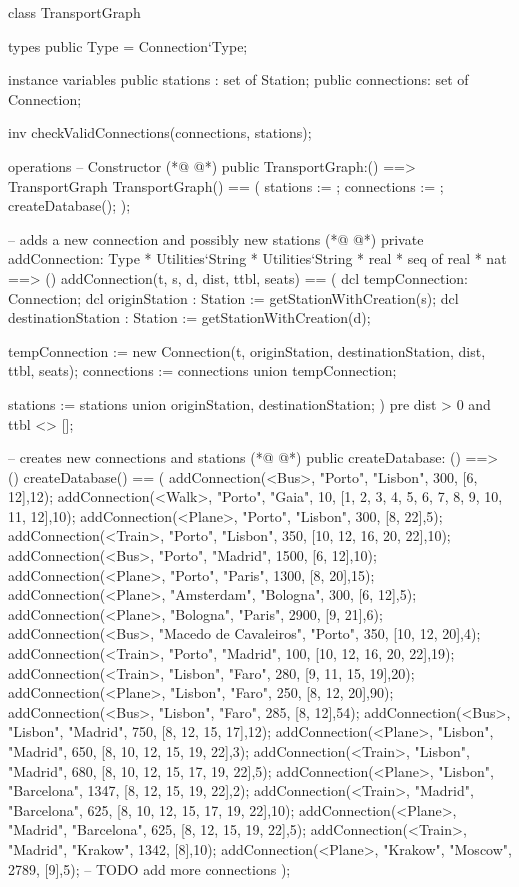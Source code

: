 \begin{vdmpp}[breaklines=true]
class TransportGraph

types
 public Type = Connection`Type;
 
instance variables
 public stations : set of Station;
 public connections: set of Connection;
 
 inv checkValidConnections(connections, stations);

operations
 -- Constructor
(*@
\label{TransportGraph:14}
@*)
 public TransportGraph:() ==> TransportGraph
 TransportGraph() ==
 (
  stations := {};
  connections := {};
  createDatabase();
 );
 
 -- adds a new connection and possibly new stations
(*@
\label{addConnection:23}
@*)
 private addConnection: Type * Utilities`String * Utilities`String * real * seq of real * nat ==> ()
 addConnection(t, s, d, dist, ttbl, seats) ==
 (
  dcl tempConnection: Connection;
  dcl originStation : Station := getStationWithCreation(s);
  dcl destinationStation : Station := getStationWithCreation(d);
  
  tempConnection := new Connection(t, originStation, destinationStation, dist, ttbl, seats);
  connections := connections union {tempConnection};
  
  stations := stations union {originStation, destinationStation};
 )
 pre dist > 0 and ttbl <> [];
  
 -- creates new connections and stations
(*@
\label{createDatabase:38}
@*)
 public createDatabase: () ==> ()
  createDatabase() ==
  (
   addConnection(<Bus>,   "Porto", "Lisbon", 300, [6, 12],12);
   addConnection(<Walk>,   "Porto", "Gaia", 10, [1, 2, 3, 4, 5, 6, 7, 8, 9, 10, 11, 12],10);
   addConnection(<Plane>, "Porto", "Lisbon", 300, [8, 22],5);
   addConnection(<Train>, "Porto", "Lisbon", 350, [10, 12, 16, 20, 22],10);
   addConnection(<Bus>,   "Porto", "Madrid", 1500, [6, 12],10);
   addConnection(<Plane>,   "Porto", "Paris", 1300, [8, 20],15);
   addConnection(<Plane>, "Amsterdam", "Bologna", 300, [6, 12],5);
   addConnection(<Plane>, "Bologna", "Paris", 2900, [9, 21],6);
   addConnection(<Bus>,   "Macedo de Cavaleiros", "Porto", 350, [10, 12, 20],4);
   addConnection(<Train>, "Porto", "Madrid", 100, [10, 12, 16, 20, 22],19);
   addConnection(<Train>, "Lisbon", "Faro", 280, [9, 11, 15, 19],20);
   addConnection(<Plane>, "Lisbon", "Faro", 250, [8, 12, 20],90);
   addConnection(<Bus>,   "Lisbon", "Faro", 285, [8, 12],54);
   addConnection(<Bus>, "Lisbon", "Madrid", 750, [8, 12, 15, 17],12);
   addConnection(<Plane>, "Lisbon", "Madrid", 650, [8, 10, 12, 15, 19, 22],3);
   addConnection(<Train>, "Lisbon", "Madrid", 680, [8, 10, 12, 15, 17, 19, 22],5);
   addConnection(<Plane>, "Lisbon", "Barcelona", 1347, [8, 12, 15, 19, 22],2);
   addConnection(<Train>, "Madrid", "Barcelona", 625, [8, 10, 12, 15, 17, 19, 22],10);
   addConnection(<Plane>, "Madrid", "Barcelona", 625, [8, 12, 15, 19, 22],5);
   addConnection(<Train>, "Madrid", "Krakow", 1342, [8],10);
   addConnection(<Plane>, "Krakow", "Moscow", 2789, [9],5);
   -- TODO add more connections
  ); 
  

\end{vdmpp}
